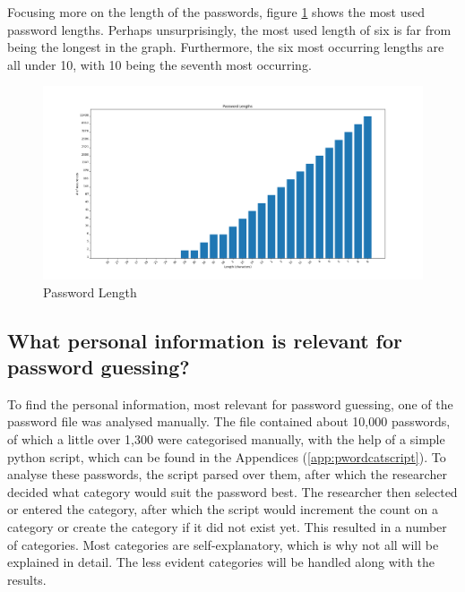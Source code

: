 \documentclass[a4paper,12pt]{article}
\begin{document}
Focusing more on the length of the passwords, figure \ref{fig:plen} shows the most used password lengths. Perhaps unsurprisingly, the most used length of six is far from being the longest in the graph. Furthermore, the six most occurring lengths are all under 10, with 10 being the seventh most occurring.

\begin{figure}[!ht]
  \centering
  \hspace*{-5.4cm}
  \includegraphics[width=1.8\textwidth]{password_length}
  \caption{Password Length}
  \label{fig:plen}
\end{figure}

\newpage
\subsection{What personal information is relevant for password guessing?}

To find the personal information, most relevant for password guessing, one of the password file was analysed manually. The file contained about 10,000 passwords, of which a little over 1,300 were categorised manually, with the help of a simple python script, which can be found in the Appendices (\ref{app:pwordcatscript}). To analyse these passwords, the script parsed over them, after which the researcher decided what category would suit the password best. The researcher then selected or entered the category, after which the script would increment the count on a category or create the category if it did not exist yet. This resulted in a number of categories. Most categories are self-explanatory, which is why not all will be explained in detail. The less evident categories will be handled along with the results.
\end{document}
